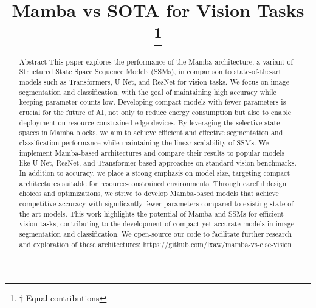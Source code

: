 \documentclass[conference]{IEEEtran}
\begin{document}
\title{Mamba vs SOTA for Vision Tasks\\
    \thanks{$\dagger$ Equal contributions}
}

\author{
    \and
}

\maketitle

\begin{abstract}
    Abstract
    This paper explores the performance of the Mamba architecture, a variant of Structured State Space Sequence Models (SSMs), in comparison to state-of-the-art models such as Transformers, U-Net, and ResNet for vision tasks. We focus on image segmentation and classification, with the goal of maintaining high accuracy while keeping parameter counts low. Developing compact models with fewer parameters is crucial for the future of AI, not only to reduce energy consumption but also to enable deployment on resource-constrained edge devices.
    By leveraging the selective state spaces in Mamba blocks, we aim to achieve efficient and effective segmentation and classification performance while maintaining the linear scalability of SSMs. We implement Mamba-based architectures and compare their results to popular models like U-Net, ResNet, and Transformer-based approaches on standard vision benchmarks.
    In addition to accuracy, we place a strong emphasis on model size, targeting compact architectures suitable for resource-constrained environments. Through careful design choices and optimizations, we strive to develop Mamba-based models that achieve competitive accuracy with significantly fewer parameters compared to existing state-of-the-art models.
    This work highlights the potential of Mamba and SSMs for efficient vision tasks, contributing to the development of compact yet accurate models in image segmentation and classification. We open-source our code to facilitate further research and exploration of these architectures: \href{https://github.com/lxaw/mamba-vs-else-vision}{https://github.com/lxaw/mamba-vs-else-vision}
\end{abstract}
\end{document}

